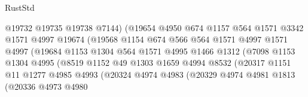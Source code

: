 \begin{lexlean}{RustStd}
\begin{coremodule}
{{                                  @19732
                                  @19735
                                  @19738
                                  @7144)
                                (@19654
                                  @4950
                                  @674
                                  @1157
                                  @564
                                  @1571
                                  @3342
                                  @1571
                                  @4997
                                  @19674
                                  (@19568
                                    @1154
                                    @674
                                    @566
                                    @564
                                    @1571
                                    @4997
                                    @1571
                                    @4997
                                    (@19684
                                      @1153
                                      @1304
                                      @564
                                      @1571
                                      @4995
                                      @1466
                                      @1312
                                      (@7098
                                        @1153
                                        @1304
                                        @4995
                                        (@8519
                                          @1152
                                          @49
                                          @1303
                                          @1659
                                          @4994
                                          @8532
                                          (@20317
                                            @1151
                                            @11
                                            @1277
                                            @4985
                                            @4993
                                            (@20324
                                              @4974
                                              @4983
                                              (@20329
                                                @4974
                                                @4981
                                                @1813
                                                (@20336
                                                  @4973
                                                  @4980
}}
\end{coremodule}
\end{lexlean}
